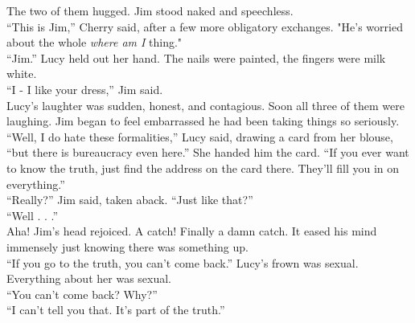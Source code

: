 The two of them hugged.  Jim stood naked and speechless.\\



\enquote{This is Jim,} Cherry said, after a few more obligatory exchanges.  "He's worried about the whole \textit{where am I}
 thing."\\



\enquote{Jim.}  Lucy held out her hand.  The nails were painted, the fingers were milk white.\\



\enquote{I - I like your dress,} Jim said.\\



Lucy's laughter was sudden, honest, and contagious.  Soon all three of them were laughing.  Jim began to feel embarrassed he had been taking things so seriously.\\



\enquote{Well, I do hate these formalities,} Lucy said, drawing a card from her blouse, \enquote{but there is bureaucracy even here.}  She handed him the card.  \enquote{If you ever want to know the truth, just find the address on the card there.  They'll fill you in on everything.}\\



\enquote{Really?} Jim said, taken aback.  \enquote{Just like that?}\\



\enquote{Well . . .}\\



Aha!  Jim's head rejoiced.  A catch!  Finally a damn catch.  It eased his mind immensely just knowing there was something up.\\



\enquote{If you go to the truth, you can't come back.}  Lucy's frown was sexual.  Everything about her was sexual.\\



\enquote{You can't come back?  Why?}\\



\enquote{I can't tell you that.  It's part of the truth.}\\



